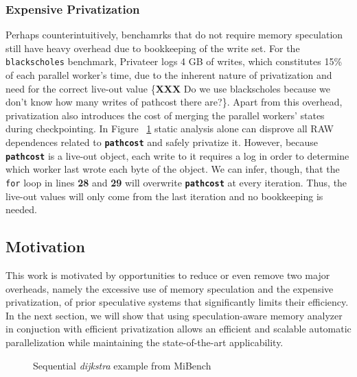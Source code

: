 \subsubsection{Expensive Privatization}
Perhaps counterintuitively, benchamrks that do not require memory speculation
still have heavy overhead due to bookkeeping of the write set. For the
\texttt{blackscholes} benchmark, Privateer logs 4 GB of writes,
which constitutes 15\% of each parallel worker's time, due to the inherent
nature of privatization and need for the correct live-out value \{\textbf{XXX} Do we
use blackscholes because we don't know how many writes of pathcost there
are?\}. Apart from this overhead, privatization also introduces the cost of
merging the parallel workers' states during checkpointing. In Figure
~\ref{fig:dijkstra_motivation} static analysis alone can disprove all RAW
dependences related to \texttt{\textbf{pathcost}} and safely privatize it.
However, because \texttt{\textbf{pathcost}} is a live-out object, each
write to it requires a log in order to determine which worker last wrote
each byte of the object. We can infer, though, that the \texttt{for} loop
in lines \textbf{28} and \textbf{29} will overwrite
\texttt{\textbf{pathcost}} at every iteration. Thus, the live-out values
will only come from the last iteration and no bookkeeping is needed.

\subsection{Motivation}
This work is motivated by opportunities to reduce or even remove two
major overheads, namely the excessive use of memory speculation and the
expensive privatization, of prior speculative systems that significantly
limits their efficiency.
%
In the next section, we will show that using speculation-aware memory
analyzer in conjuction with efficient privatization allows an efficient and
scalable automatic parallelization while maintaining the state-of-the-art
applicability.


\lstset{basicstyle=\ttfamily, numbers=left, numberstyle=\tiny,
  stepnumber=1, numbersep=5pt}
\begin{figure}[t]
  \centering
  \scriptsize
    \subfloat{
    \begin{minipage}{5cm}
      
    \end{minipage}
    }
\caption{Sequential \textit{dijkstra} example from MiBench~\cite{}}
\label{fig:dijkstra_motivation}
\end{figure}
